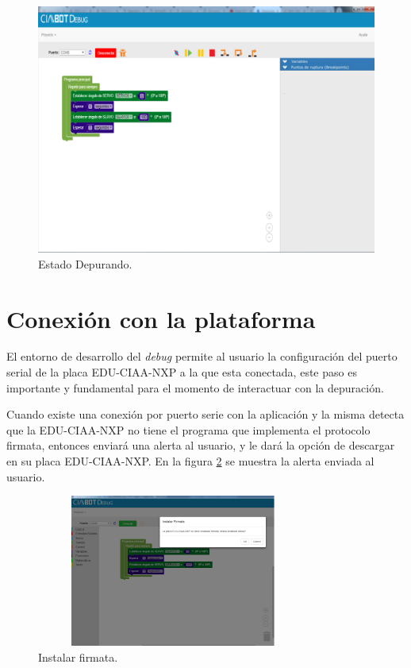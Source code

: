 \begin{figure}[!htbp]
	\begin{center}  %
		\includegraphics[scale=.35]{./Figures/debug-debug.png}
		\par\caption{Estado Depurando.}\label{fig:debug}
	\end{center}
\end{figure}

\section{Conexión con la plataforma}
\label{sec:Conexión con la plataforma}

El entorno de desarrollo del \emph{debug} permite al usuario la configuración del puerto serial de la placa EDU-CIAA-NXP a la que esta conectada, este paso es importante y fundamental para el momento de interactuar con la depuración.

Cuando existe una conexión por puerto serie con la aplicación y la misma detecta que la EDU-CIAA-NXP no tiene el programa que implementa el protocolo firmata, entonces enviará una alerta al usuario, y le dará la opción de descargar en su placa EDU-CIAA-NXP.
En la figura \ref{fig:instalar-firmata} se muestra la alerta enviada al usuario.

\begin{figure}[!htbp]
	\begin{center}  %
		\includegraphics*[width=9cm,height=5cm]{./Figures/instalar-firmata.png}
		\par\caption{Instalar firmata.}\label{fig:instalar-firmata}
	\end{center}
\end{figure}

